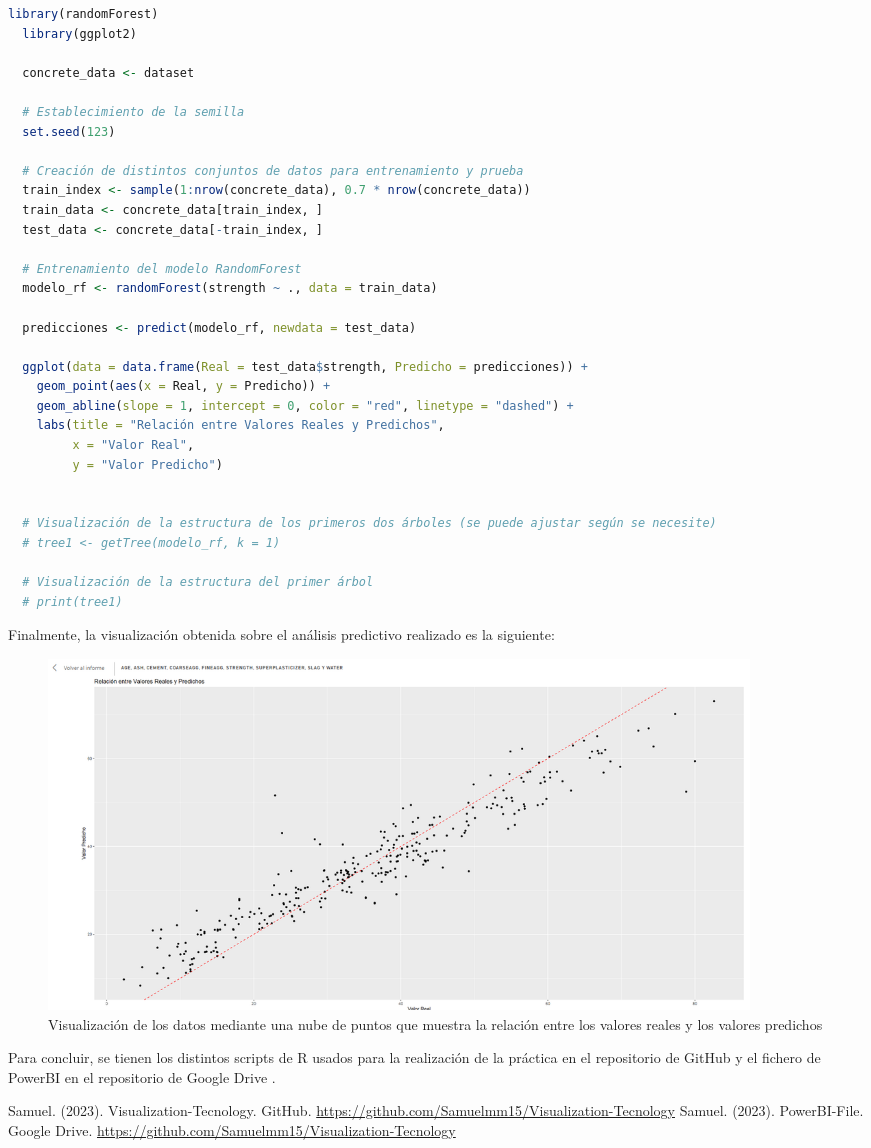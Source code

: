 \documentclass[11pt]{report}
\begin{document}
\begin{lstlisting}[language=R, breaklines=true, basicstyle=\small\ttfamily]
  library(randomForest)
  library(ggplot2)
  
  concrete_data <- dataset
  
  # Establecimiento de la semilla
  set.seed(123)
  
  # Creación de distintos conjuntos de datos para entrenamiento y prueba
  train_index <- sample(1:nrow(concrete_data), 0.7 * nrow(concrete_data))
  train_data <- concrete_data[train_index, ]
  test_data <- concrete_data[-train_index, ]
  
  # Entrenamiento del modelo RandomForest
  modelo_rf <- randomForest(strength ~ ., data = train_data)
  
  predicciones <- predict(modelo_rf, newdata = test_data)
  
  ggplot(data = data.frame(Real = test_data$strength, Predicho = predicciones)) +
    geom_point(aes(x = Real, y = Predicho)) +
    geom_abline(slope = 1, intercept = 0, color = "red", linetype = "dashed") +
    labs(title = "Relación entre Valores Reales y Predichos",
         x = "Valor Real",
         y = "Valor Predicho")
  
  
  # Visualización de la estructura de los primeros dos árboles (se puede ajustar según se necesite)
  # tree1 <- getTree(modelo_rf, k = 1)
  
  # Visualización de la estructura del primer árbol
  # print(tree1)
\end{lstlisting}

Finalmente, la visualización obtenida sobre el análisis predictivo realizado es la siguiente:

\begin{figure}[H]
  \centering
  \includegraphics[width=0.9\textwidth]{./img/Random-Forest-Image.png}
  \caption{Visualización de los datos mediante una nube de puntos que muestra la relación entre los valores reales y los valores predichos}
  \label{fig:randomForest}
\end{figure}

Para concluir, se tienen los distintos scripts de R usados para la realización de la práctica en el repositorio de GitHub \cite{1} y el fichero de PowerBI en el repositorio de Google Drive \cite{2}.

\begin{thebibliography}{99}
   Samuel. (2023). Visualization-Tecnology. GitHub. \url{https://github.com/Samuelmm15/Visualization-Tecnology}
   Samuel. (2023). PowerBI-File. Google Drive. \url{https://github.com/Samuelmm15/Visualization-Tecnology}
\end{thebibliography}
\end{document}
